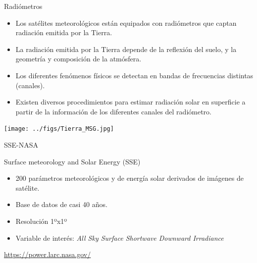 \documentclass[aspectratio=169, usenames,svgnames,dvipsnames]{beamer}
\begin{document}
\begin{frame}[label={sec:orgdbaa734}]{Radiómetros}
\begin{itemize}
\item Los satélites meteorológicos están equipados con \alert{radiómetros}
que captan \alert{radiación emitida por la Tierra}.

\item La radiación emitida por la Tierra depende de la \alert{reflexión del
suelo}, y la \alert{geometría y composición de la atmósfera}.

\item Los diferentes fenómenos físicos se detectan en \alert{bandas de frecuencias}
distintas (canales).

\item Existen diversos procedimientos para \alert{estimar radiación solar} en
superficie a partir de la información de los diferentes canales del
radiómetro.
\end{itemize}

\begin{center}
\begin{center}
\texttt{[image: ../figs/Tierra\_MSG.jpg]}
\end{center}
\end{center}
\end{frame}
\begin{frame}[label={sec:orgdbbef45}]{SSE-NASA}
\begin{block}{Surface meteorology and Solar Energy (SSE)}
\begin{itemize}
\item 200 parámetros meteorológicos y de energía solar derivados de imágenes de satélite.
\item Base de datos de casi 40 años.
\item Resolución 1ºx1º
\item Variable de interés: \emph{All Sky Surface Shortwave Downward Irradiance}
\end{itemize}

\url{https://power.larc.nasa.gov/}
\end{block}
\end{frame}
\end{document}
